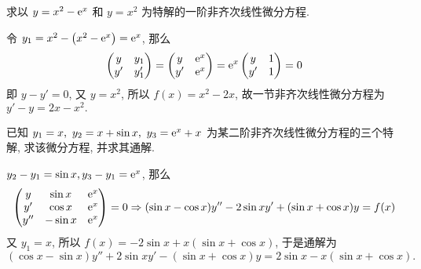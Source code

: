 \begin{example}
    求以 $y=x^2-\mathrm{e}^x$ 和 $y=x^2$ 为特解的一阶非齐次线性微分方程.
\end{example}
\begin{solution}
    令 $y_1=x^2-\qty(x^2-\mathrm{e}^x)=\mathrm{e}^x$, 那么 $$\begin{pmatrix} y & y_1 \\ y' & y'_1 \\\end{pmatrix}=\begin{pmatrix} y & \mathrm{e}^x \\ y' & \mathrm{e}^x \\\end{pmatrix}=\mathrm{e}^x\begin{pmatrix} y & 1 \\ y' & 1 \\\end{pmatrix}=0$$
    即 $y-y'=0$, 又 $y=x^2$, 所以 $f(x)=x^2-2x$, 故一节非齐次线性微分方程为 $y'-y=2x-x^2.$
\end{solution}

\begin{example}
    已知 $y_1=x,~y_2=x+\sin x,~y_3=\mathrm{e} ^x+x$ 为某二阶非齐次线性微分方程的三个特解, 求该微分方程, 并求其通解.
\end{example}
\begin{solution}
    $y_2-y_1=\sin x, y_3-y_1=\mathrm{e}^x$, 那么 $$\begin{pmatrix} y & \sin x & \mathrm{e}^x \\ y' & \cos x & \mathrm{e}^x \\ y'' & -\sin x & \mathrm{e}^x \\\end{pmatrix}=0\Rightarrow (\sin x-\cos x)y''-2\sin xy'+(\sin x+\cos x)y=f(x)$$
    又 $y_1=x$, 所以 $f(x)=-2\sin x+x(\sin x+\cos x)$, 于是通解为
    $$
        (\cos x-\sin x)y''+2\sin xy'-(\sin x+\cos x)y=2\sin x-x(\sin x+\cos x).
    $$
\end{solution}


